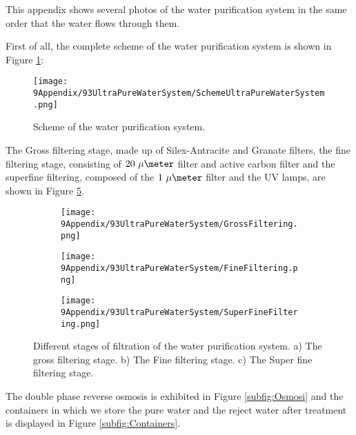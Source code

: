 This appendix shows several photos of the water purification system in the same order that the water flows through them.

First of all, the complete scheme of the water purification system is shown in Figure \ref{fig:SchemeUPWS}:

\begin{figure}[htbp]
\centering
\texttt{[image: 9Appendix/93UltraPureWaterSystem/SchemeUltraPureWaterSystem.png]}
\caption{Scheme of the water purification system.\label{fig:SchemeUPWS}}
\end{figure}

The Gross filtering stage, made up of Silex-Antracite and Granate filters, the fine filtering stage, consisting of $20~\mu\meter$ filter and active carbon filter and the superfine filtering, composed of the $1~\mu\meter$ filter and the UV lamps, are shown in Figure \ref{fig:UltraPureWaterStages}.

\begin{figure}
\centering
    \begin{subfigure}[b]{0.3\textwidth}
    \centering
    \texttt{[image: 9Appendix/93UltraPureWaterSystem/GrossFiltering.png]}  
    \caption{\label{subfig:GrossFiltering}}
    \end{subfigure}
    \hfill
    \begin{subfigure}[b]{0.3\textwidth}
    \centering
    \texttt{[image: 9Appendix/93UltraPureWaterSystem/FineFiltering.png]}  
    \caption{\label{subfig:FineFiltering}}
    \end{subfigure}
    \hfill
    \begin{subfigure}[b]{0.3\textwidth}
    \centering
    \texttt{[image: 9Appendix/93UltraPureWaterSystem/SuperFineFiltering.png]}  
    \caption{\label{subfig:SuperFineFiltering}}
    \end{subfigure}
 \caption{Different stages of filtration of the water purification system. a) The gross filtering stage. b) The Fine filtering stage. c) The Super fine filtering stage.}
 \label{fig:UltraPureWaterStages}
\end{figure}

The double phase reverse osmosis is exhibited in Figure \ref{subfig:Osmosi} and the containers in which we store the pure water and the reject water after treatment is displayed in Figure \ref{subfig:Containers}.

